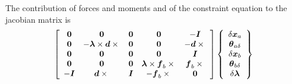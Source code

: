 \documentclass[10pt,dvips,fleqn]{report}
\newcommand{\T}[1]{\boldsymbol{#1}}
\begin{document}
The contribution of forces and moments and of the constraint equation 
to the jacobian matrix is
\begin{equation}
	\sqbr{\matr{ccccc}{
		\T{0} & \T{0} & \T{0} & \T{0} & - \T{I} \\
		\T{0} & - \T{\lambda}\times\T{d}\times{} & \T{0} & \T{0} & - \T{d}\times{}\\
		\T{0} & \T{0} & \T{0} & \T{0} & \T{I} \\
		\T{0} & \T{0} & \T{0} & \T{\lambda}\times\T{f}_b\times{} & \T{f}_b\times{} \\
		- \T{I} & \T{d}\times{} & \T{I} & - \T{f}_b\times{} & \T{0}
	}}\cubr{\cvvect{
		\delta\T{x}_a \\
		\T{\theta}_{a\delta} \\
		\delta\T{x}_b \\
		\T{\theta}_{b\delta} \\
		\delta\T{\lambda}
	}}
\end{equation}
\end{document}
